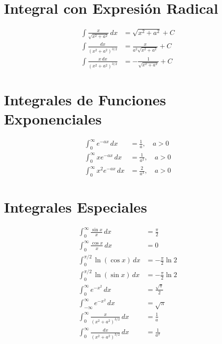 \documentclass[11pt]{article}
\begin{document}
\section*{Integral con Expresión Radical}

\begin{align}
    \int \frac{x}{\sqrt{x^2 + a^2}} \, dx &= \sqrt{x^2 + a^2} + C \\[10pt]
    \int \frac{dx}{(x^2 + a^2)^{3/2}} &= \frac{x}{a^2 \sqrt{x^2 + a^2}} + C \\[10pt]
    \int \frac{x \, dx}{(x^2 + a^2)^{3/2}} &= -\frac{1}{\sqrt{x^2 + a^2}} + C
\end{align}


\section*{Integrales de Funciones Exponenciales}

\begin{align}
    \int_0^{\infty} e^{-ax} \, dx &= \frac{1}{a}, \quad a > 0 \\[10pt]
    \int_0^{\infty} x e^{-ax} \, dx &= \frac{1}{a^2}, \quad a > 0 \\[10pt]
    \int_0^{\infty} x^2 e^{-ax} \, dx &= \frac{2}{a^3}, \quad a > 0
\end{align}

\section*{Integrales Especiales}

\begin{align}
    \int_0^{\infty} \frac{\sin x}{x} \, dx &= \frac{\pi}{2} \\[10pt]
    \int_0^{\infty} \frac{\cos x}{x} \, dx &= 0 \\[10pt]
    \int_0^{\pi/2} \ln (\cos x) \, dx &= -\frac{\pi}{2} \ln 2 \\[10pt]
    \int_0^{\pi/2} \ln (\sin x) \, dx &= -\frac{\pi}{2} \ln 2 \\[10pt]
    \int_0^{\infty} e^{-x^2} \, dx &= \frac{\sqrt{\pi}}{2} \\[10pt]
    \int_{-\infty}^{\infty} e^{-x^2} \, dx &= \sqrt{\pi} \\[10pt]
    \int_0^{\infty} \frac{x}{(x^2 + a^2)^{3/2}} \, dx &= \frac{1}{a} \\[10pt]
    \int_0^{\infty} \frac{dx}{(x^2 + a^2)^{3/2}} \, dx &= \frac{1}{a^2}
\end{align}
\end{document}

